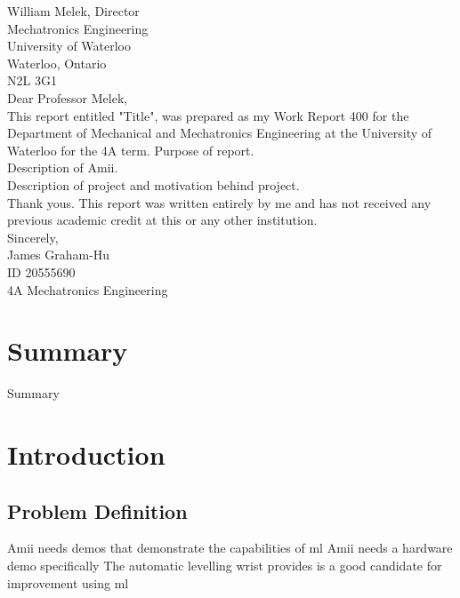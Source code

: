 \documentclass[letterpaper,12pt]{article}
\begin{document}
William Melek, Director\\
Mechatronics Engineering\\
University of Waterloo\\
Waterloo, Ontario\\
N2L 3G1\\

Dear Professor Melek,\\

This report entitled "Title", was prepared as my Work Report 400 for the Department of Mechanical and Mechatronics Engineering at the University of Waterloo for the 4A term. Purpose of report.\\

Description of Amii.\\

Description of project and motivation behind project.\\


Thank yous.
This report was written entirely by  me and has not received any previous academic credit at this or any other institution.\\

Sincerely,\\

James Graham-Hu\\
ID 20555690\\
4A Mechatronics Engineering



\pagebreak
\tableofcontents
\pagebreak
\listoffigures
\pagebreak
\listoftables
\pagebreak


\section{Summary}
Summary
\pagebreak
\section{Introduction}
\subsection{Problem Definition}
Amii needs demos that demonstrate the capabilities of ml
Amii needs a hardware demo specifically
The automatic levelling wrist provides is a good candidate for improvement using ml
\end{document}
